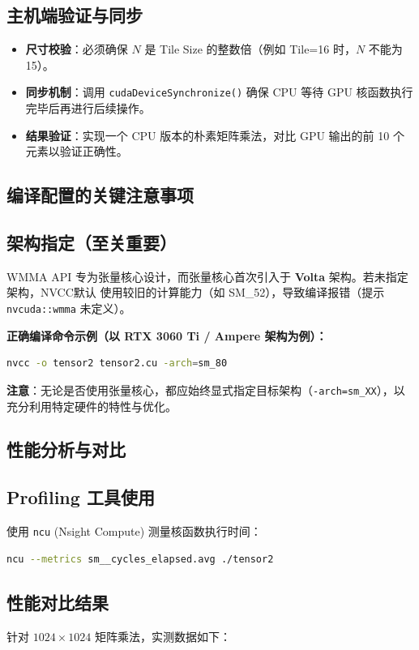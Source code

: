 \subsection{主机端验证与同步}
\begin{itemize}
    \item \textbf{尺寸校验}：必须确保 $N$ 是 Tile Size 的整数倍（例如 Tile=16 时，$N$ 不能为 15）。
    \item \textbf{同步机制}：调用 \texttt{cudaDeviceSynchronize()} 确保 CPU 等待 GPU 核函数执行完毕后再进行后续操作。
    \item \textbf{结果验证}：实现一个 CPU 版本的朴素矩阵乘法，对比 GPU 输出的前 10 个元素以验证正确性。
\end{itemize}

\subsection{编译配置的关键注意事项}

\subsection{架构指定（至关重要）}
WMMA API 专为张量核心设计，而张量核心首次引入于 \textbf{Volta} 架构。若未指定架构，NVCC默认
使用较旧的计算能力（如 SM\_52），导致编译报错（提示 \texttt{nvcuda::wmma} 未定义）。

\textbf{正确编译命令示例（以 RTX 3060 Ti / Ampere 架构为例）：}
\begin{lstlisting}[language=bash]
nvcc -o tensor2 tensor2.cu -arch=sm_80
\end{lstlisting}

\noindent \textbf{注意}：无论是否使用张量核心，都应始终显式指定目标架构（\texttt{-arch=sm\_XX}），以充分利用特定硬件的特性与优化。

\subsection{性能分析与对比}

\subsection{Profiling 工具使用}
使用 \texttt{ncu} (Nsight Compute) 测量核函数执行时间：
\begin{lstlisting}[language=bash]
ncu --metrics sm__cycles_elapsed.avg ./tensor2
\end{lstlisting}

\subsection{性能对比结果}
针对 $1024 \times 1024$ 矩阵乘法，实测数据如下：

